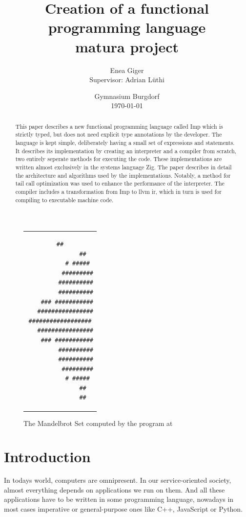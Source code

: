 \documentclass[12pt]{article}
\title{Creation of a functional programming language\\matura project}
\author{Enea Giger\\Supervisor: Adrian Lüthi}
\date{Gymnasium Burgdorf\\\today}
\begin{document}
\maketitle
\begin{figure}[h]
	\centering
	\begin{tabular}{c}
		\begin{lstlisting}[basicstyle=\tiny]
             ##
             ##
          # #####
          #########
         ##########
         ##########
    ### ###########
   ################
##################
   ################
    ### ###########
         ##########
         ##########
          #########
          # #####
             ##
             ##
\end{lstlisting}\end{tabular}
	\caption{The Mandelbrot Set computed by the program at }
\end{figure}


\begin{abstract}
	This paper describes a new functional programming language called Imp
	which is strictly typed, but does not need explicit type annotations by the
	developer. The language is kept simple, deliberately having a small set of expressions and statements.
	It describes its implementation by creating an interpreter and a compiler from scratch,
	two entirely seperate methods for executing the code.
	These implementations are written almost exclusively in the systems language
	Zig.
	The paper describes in detail the architecture and algorithms used by the
	implementations. Notably, a method for tail call optimization was used
	to enhance the performance of the interpreter. The compiler includes
	a transformation from Imp to \Gls{llvm} \gls{ir},
	which in turn is used for compiling to executable machine code.
\end{abstract}
\newpage

\tableofcontents
\newpage

\section{Introduction}
In todays world, computers are omnipresent. In our service-oriented society,
almost everything depends on applications we run on them.
And all these applications have to be written in some programming language,
nowadays in most cases imperative or general-purpose ones like C++, JavaScript or Python.
\end{document}
